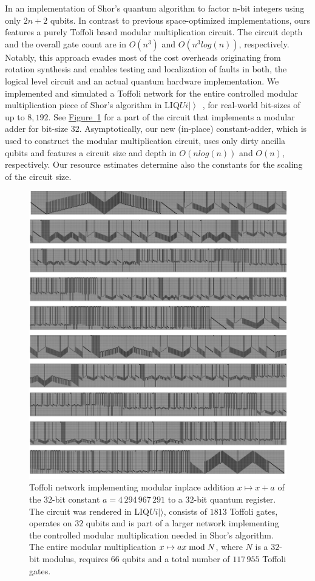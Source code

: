 \documentclass[conference]{IEEEtran}
\newcommand{\fig}[1]{\hyperref[fig:#1]{Figure~\ref*{fig:#1}}}
\newcommand{\ket}[1]{\left| #1\right\rangle}        %
\newcommand{\Liquid}{LIQ$Ui\ket{}$\ }
\begin{document}
In \cite{HRS16} an implementation of Shor's quantum algorithm to factor n-bit integers using only $2n+2$ qubits. In contrast to previous space-optimized implementations, ours features a purely Toffoli based modular multiplication circuit. The circuit depth and the overall gate count are in $O(n^3)$ and $O(n^3 log(n))$, respectively. Notably, this approach evades most of the cost overheads originating from rotation synthesis and enables testing and localization of faults in both, the logical level circuit and an actual quantum hardware implementation. We implemented and simulated a Toffoli network for the entire controlled modular multiplication piece of Shor's algorithm in \Liquid, for real-world bit-sizes of up to $8,1 92$. See \fig{adder} for a part of the circuit that implements a modular adder for bit-size $32$. Asymptotically, our new (in-place) constant-adder, which is used to construct the modular multiplication circuit, uses only dirty ancilla qubits and features a circuit size and depth in $O(n log(n))$ and $O(n)$, respectively. Our resource estimates determine also the constants for the scaling of the circuit size. 

\begin{figure}[hbt]
\centering
\includegraphics[width=0.9\columnwidth]{pictures/adder.pdf}
\caption{\label{fig:adder} Toffoli network \cite{HRS16} implementing modular inplace addition $x \mapsto x+a$ of the $32$-bit constant $a=4\,294\,967\,291$ to a $32$-bit quantum register. The circuit was rendered in LIQ$Ui|\rangle$, consists of $1813$ Toffoli gates, operates on $32$ qubits and is part of a larger network implementing the controlled modular multiplication needed in Shor's algorithm. The entire modular multiplication $x \mapsto ax\;{\rm mod}\;N$, where $N$ is a $32$-bit modulus, requires $66$ qubits and a total number of $117\,955$ Toffoli gates.}
\end{figure}
\end{document}
